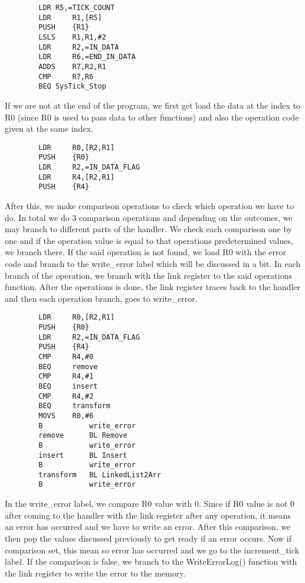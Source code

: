 \documentclass[pdftex,12pt,a4paper]{article}
\begin{document}
\begin{lstlisting}
        LDR	R5,=TICK_COUNT			
        LDR     R1,[R5]						
        PUSH    {R1}						
        LSLS    R1,R1,#2					
        LDR     R2,=IN_DATA					
        LDR     R6,=END_IN_DATA				
        ADDS    R7,R2,R1					
        CMP     R7,R6						
        BEQ	SysTick_Stop				
\end{lstlisting}

If we are not at the end of the program, we first get load the data at the index to R0 (since R0 is used to pass data to other functions) and also the operation code given at the same index.
\begin{lstlisting}
        LDR     R0,[R2,R1]				
        PUSH    {R0}						
        LDR     R2,=IN_DATA_FLAG	
        LDR     R4,[R2,R1]
        PUSH    {R4}	
\end{lstlisting}

After this, we make comparison operations to check which operation we have to do. In total we do 3 comparison operations and depending on the outcomes, we may branch to different parts of the handler. We check each comparison one by one and if the operation value is equal to that operations predetermined values, we branch there. If the said operation is not found, we load R0 with the error code and branch to the write\_error label which will be discussed in a bit. In each branch of the operation, we branch with the link register to the said operations function. After the operations is done, the link register traces back to the handler and then each operation branch, goes to write\_error.
\begin{lstlisting}
        LDR     R0,[R2,R1]				
        PUSH    {R0}						
        LDR     R2,=IN_DATA_FLAG		
        PUSH    {R4}				
        CMP     R4,#0						
        BEQ     remove				
        CMP     R4,#1				
        BEQ     insert					
        CMP     R4,#2					
        BEQ     transform				
        MOVS    R0,#6 						
        B           write_error					
        remove	    BL Remove						
        B           write_error					
        insert	    BL Insert					
        B           write_error				
        transform   BL LinkedList2Arr			
        B           write_error					
\end{lstlisting}

In the write\_error label, we compare R0 value with 0. Since if R0 value is not 0 after coming to the handler with the link register after any operation, it means an error has occurred and we have to write an error. After this comparison, we then pop the values discussed previously to get ready if an error occurs. Now if comparison set, this mean so error has occurred and we go to the increment\_tick label. If the comparison is false, we branch to the WriteErrorLog() function with the link register to write the error to the memory.
\end{document}
